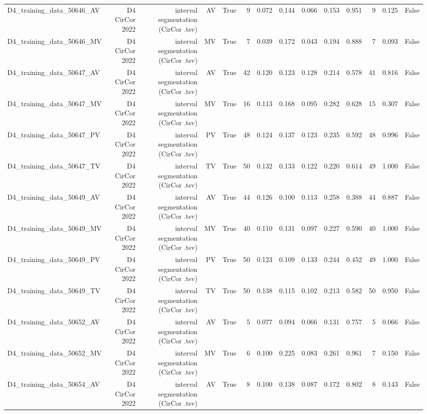 \begin{table}[htbp]
\begin{tabular}{lrrrrrrrrrrrrr}
    D4\_training\_data\_50646\_AV & D4 CirCor 2022 & interval segmentation (CirCor .tsv) & AV & True & 9 & 0.072 & 0.144 & 0.066 & 0.153 & 0.951 & 9 & 0.125 & False \\
    D4\_training\_data\_50646\_MV & D4 CirCor 2022 & interval segmentation (CirCor .tsv) & MV & True & 7 & 0.039 & 0.172 & 0.043 & 0.194 & 0.888 & 7 & 0.093 & False \\
    D4\_training\_data\_50647\_AV & D4 CirCor 2022 & interval segmentation (CirCor .tsv) & AV & True & 42 & 0.120 & 0.123 & 0.128 & 0.214 & 0.578 & 41 & 0.816 & False \\
    D4\_training\_data\_50647\_MV & D4 CirCor 2022 & interval segmentation (CirCor .tsv) & MV & True & 16 & 0.113 & 0.168 & 0.095 & 0.282 & 0.628 & 15 & 0.307 & False \\
    D4\_training\_data\_50647\_PV & D4 CirCor 2022 & interval segmentation (CirCor .tsv) & PV & True & 48 & 0.124 & 0.137 & 0.123 & 0.235 & 0.592 & 48 & 0.996 & False \\
    D4\_training\_data\_50647\_TV & D4 CirCor 2022 & interval segmentation (CirCor .tsv) & TV & True & 50 & 0.132 & 0.133 & 0.122 & 0.220 & 0.614 & 49 & 1.000 & False \\
    D4\_training\_data\_50649\_AV & D4 CirCor 2022 & interval segmentation (CirCor .tsv) & AV & True & 44 & 0.126 & 0.100 & 0.113 & 0.258 & 0.388 & 44 & 0.887 & False \\
    D4\_training\_data\_50649\_MV & D4 CirCor 2022 & interval segmentation (CirCor .tsv) & MV & True & 40 & 0.110 & 0.131 & 0.097 & 0.227 & 0.590 & 40 & 1.000 & False \\
    D4\_training\_data\_50649\_PV & D4 CirCor 2022 & interval segmentation (CirCor .tsv) & PV & True & 50 & 0.123 & 0.109 & 0.133 & 0.244 & 0.452 & 49 & 1.000 & False \\
    D4\_training\_data\_50649\_TV & D4 CirCor 2022 & interval segmentation (CirCor .tsv) & TV & True & 50 & 0.138 & 0.115 & 0.102 & 0.213 & 0.582 & 50 & 0.950 & False \\
    D4\_training\_data\_50652\_AV & D4 CirCor 2022 & interval segmentation (CirCor .tsv) & AV & True & 5 & 0.077 & 0.094 & 0.066 & 0.131 & 0.757 & 5 & 0.066 & False \\
    D4\_training\_data\_50652\_MV & D4 CirCor 2022 & interval segmentation (CirCor .tsv) & MV & True & 6 & 0.100 & 0.225 & 0.083 & 0.261 & 0.961 & 7 & 0.150 & False \\
    D4\_training\_data\_50654\_AV & D4 CirCor 2022 & interval segmentation (CirCor .tsv) & AV & True & 8 & 0.100 & 0.138 & 0.087 & 0.172 & 0.802 & 8 & 0.143 & False \\

\end{tabular}
\end{table}
